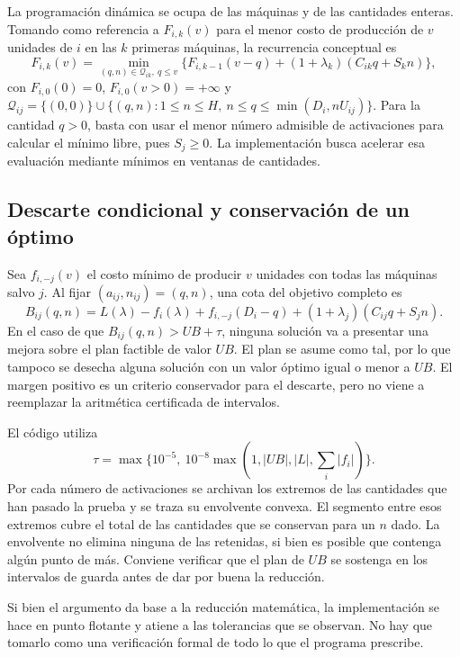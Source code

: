 La programación dinámica se ocupa de las máquinas y de las cantidades enteras. Tomando como referencia a $F_{i,k}(v)$ para el menor costo de producción de $v$ unidades de $i$ en las $k$ primeras máquinas, la recurrencia conceptual es
\[
F_{i,k}(v)=\min_{(q,n)\in\mathcal Q_{ik},\ q\leq v}
\{F_{i,k-1}(v-q)+(1+\lambda_k)(C_{ik}q+S_kn)\},
\]
con $F_{i,0}(0)=0$, $F_{i,0}(v>0)=+\infty$ y
$\mathcal Q_{ij}=\{(0,0)\}\cup\{(q,n):1\leq n\leq H,\ n\leq q\leq\min(D_i,nU_{ij})\}$.
Para la cantidad $q>0$, basta con usar el menor número admisible de activaciones para calcular el mínimo libre, pues $S_j\geq0$. La implementación busca acelerar esa evaluación mediante mínimos en ventanas de cantidades.

\subsection{Descarte condicional y conservación de un óptimo}
Sea $f_{i,-j}(v)$ el costo mínimo de producir $v$ unidades con todas las máquinas salvo $j$. Al fijar $(a_{ij},n_{ij})=(q,n)$, una cota del objetivo completo es
\[
B_{ij}(q,n)=L(\lambda)-f_i(\lambda)+f_{i,-j}(D_i-q)
 +(1+\lambda_j)(C_{ij}q+S_jn).
\]
En el caso de que $B_{ij}(q,n)>UB+\tau$, ninguna solución va a presentar una mejora sobre el plan factible de valor $UB$. El plan se asume como tal, por lo que tampoco se desecha alguna solución con un valor óptimo igual o menor a $UB$. El margen positivo es un criterio conservador para el descarte, pero no viene a reemplazar la aritmética certificada de intervalos.

El código utiliza
\[
\tau=\max\{10^{-5},\ 10^{-8}\max(1,|UB|,|L|,\sum_i|f_i|)\}.
\]
Por cada número de activaciones se archivan los extremos de las cantidades que han pasado la prueba y se traza su envolvente convexa. El segmento entre esos extremos cubre el total de las cantidades que se conservan para un $n$ dado. La envolvente no elimina ninguna de las retenidas, si bien es posible que contenga algún punto de más. Conviene verificar que el plan de $UB$ se sostenga en los intervalos de guarda antes de dar por buena la reducción.

Si bien el argumento da base a la reducción matemática, la implementación se hace en punto flotante y atiene a las tolerancias que se observan. No hay que tomarlo como una verificación formal de todo lo que el programa prescribe.
